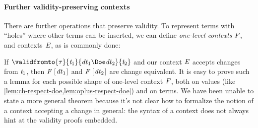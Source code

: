 \paragraph{Further validity-preserving contexts}
There are further operations that preserve validity. To represent terms with
``holes'' where other terms can be inserted, we can define \emph{one-level
contexts} \ensuremath{\Conid{F}}, and contexts \ensuremath{\Conid{E}}, as is commonly done:
\resethooks
If \ensuremath{\validfromto{\tau}{\Varid{t}_{1}}{\Varid{dt}_{1}\Doe\Varid{dt}_{2}}{\Varid{t}_{2}}} and our context \ensuremath{\Conid{E}}
accepts changes from \ensuremath{\Varid{t}_{1}}, then \ensuremath{\Conid{F}\;[\mskip1.5mu \Varid{dt}_{1}\mskip1.5mu]} and \ensuremath{\Conid{F}\;[\mskip1.5mu \Varid{dt}_{2}\mskip1.5mu]}
are change equivalent. It is easy to prove such a lemma for each possible shape
of one-level context \ensuremath{\Conid{F}}, both on values (like
\cref{lem:ch-respect-doe,lem:oplus-respect-doe}) and on terms. We have been
unable to state a more general theorem because it's not clear how to formalize
the notion of a context accepting a change in general: the syntax of a context
does not always hint at the validity proofs embedded.

